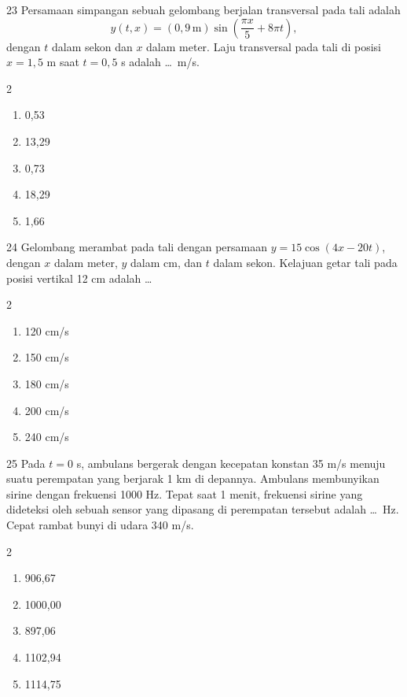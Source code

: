 \documentclass[11pt]{article}
\newenvironment{pilB}{%
  \par\smallskip\begin{multicols}{2}
  \begin{enumerate}[label=(\Alph*),leftmargin=*,itemsep=1pt,topsep=3pt]}%
  {\end{enumerate}\end{multicols}}
\begin{document}
\begin{soal}{23}
Persamaan simpangan sebuah gelombang berjalan transversal pada tali adalah
\[
  y(t,x)=(0{,}9\,\text{m})\sin\!\left(\frac{\pi x}{5}+8\pi t\right),
\]
dengan $t$ dalam sekon dan $x$ dalam meter. Laju transversal pada tali
di posisi $x=1{,}5$ m saat $t=0{,}5$ s adalah \ldots\ m/s.
\begin{pilB}
  \item 0,53 \item 13,29 \item 0,73 \item 18,29 \item 1,66
\end{pilB}
\end{soal}

\begin{soal}{24}
Gelombang merambat pada tali dengan persamaan $y=15\cos(4x-20t)$,
dengan $x$ dalam meter, $y$ dalam cm, dan $t$ dalam sekon. Kelajuan
getar tali pada posisi vertikal 12 cm adalah \ldots
\begin{pilB}
  \item 120 cm/s \item 150 cm/s \item 180 cm/s \item 200 cm/s \item 240 cm/s
\end{pilB}
\end{soal}

\begin{soal}{25}
Pada $t=0$ s, ambulans bergerak dengan kecepatan konstan 35 m/s menuju
suatu perempatan yang berjarak 1 km di depannya. Ambulans membunyikan
sirine dengan frekuensi 1000 Hz. Tepat saat 1 menit, frekuensi sirine
yang dideteksi oleh sebuah sensor yang dipasang di perempatan tersebut
adalah \ldots\ Hz. Cepat rambat bunyi di udara 340 m/s.
\begin{pilB}
  \item 906,67 \item 1000,00 \item 897,06 \item 1102,94 \item 1114,75
\end{pilB}
\end{soal}
\end{document}
